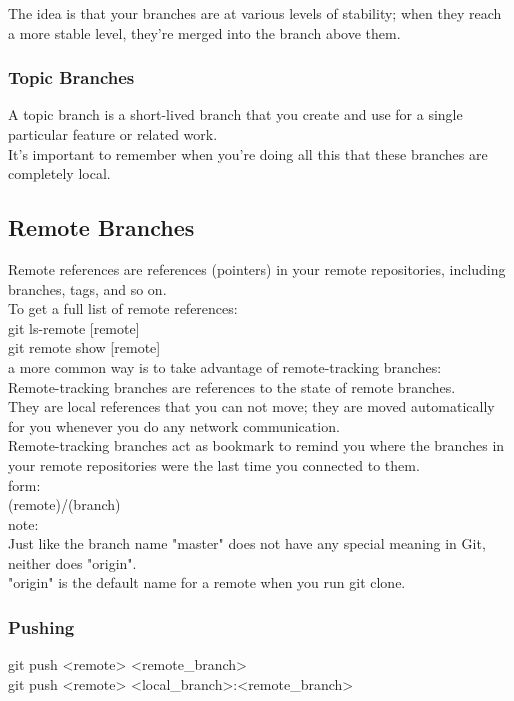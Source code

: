 \documentclass[11pt]{article}
\begin{document}
The idea is that your branches are at various levels of stability; when they reach a more stable level, they're merged into the branch above them.\\


\subsubsection{Topic Branches}
\label{sec:org3c0dddd}
A topic branch is a short-lived branch that you create and use for a single particular feature or related work.\\

It's important to remember when you're doing all this that these branches are completely local.\\

\subsection{Remote Branches}
\label{sec:org7ce8ed3}
Remote references are references (pointers) in your remote repositories, including branches, tags, and so on.\\

To get a full list of remote references:\\
git ls-remote [remote]\\
git remote show [remote]\\

a more common way is to take advantage of remote-tracking branches:\\
Remote-tracking branches are references to the state of remote branches.\\
They are local references that you can not move; they are moved automatically for you whenever you do any network communication.\\
Remote-tracking branches act as bookmark to remind you where the branches in your remote repositories were the last time you connected to them.\\

form:\\
(remote)/(branch)\\

note:\\
Just like the branch name "master" does not have any special meaning in Git, neither does "origin".\\
"origin" is the default name for a remote when you run git clone.\\


\subsubsection{Pushing}
\label{sec:org256bd4f}
git push <remote> <remote\_branch>\\
git push <remote> <local\_branch>:<remote\_branch>\\
\end{document}
